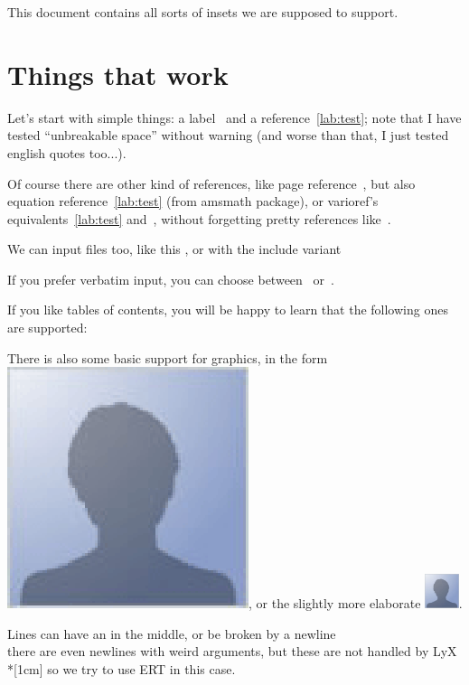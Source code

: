 \documentclass{article}
\begin{document}
This document contains all sorts of insets we are supposed to
support.

\section{Things that work}

Let's start with simple things: a label~\label{lab:test} and a
reference~\ref{lab:test}; note that I have tested ``unbreakable
space'' without warning (and worse than that, I just tested english
quotes too...).

Of course there are other kind of references, like page
reference~\pageref{lab:test}, but also equation
reference~\eqref{lab:test} (from amsmath package), or varioref's
equivalents~\vref{lab:test} and~, without
forgetting pretty references like~.

We can input files too, like this , or with the include
variant 

If you prefer verbatim input, you can choose
between~ or~.

If you like tables of contents, you will be happy to learn that
the following ones are supported:
\tableofcontents
\listoffigures
\listoftables

There is also some basic support for graphics, in the form
\includegraphics{foo.eps}, or the slightly more elaborate
\includegraphics[height=1cm, width=1cm]{foo.eps}.

Lines can have an \hfill in the middle, or be broken by a newline\\
there are even newlines with weird arguments, but these are not
handled by LyX\\*[1cm]
so we try to use ERT in this case.
\end{document}
